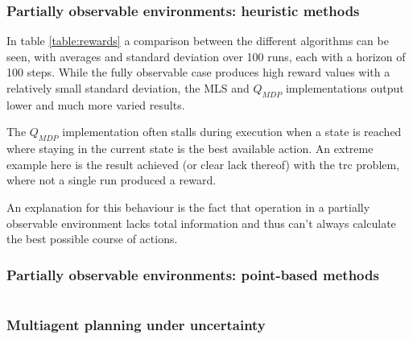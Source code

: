 \documentclass[10pt,a4paper]{article}
\begin{document}
\restoregeometry


\section{Partially observable environments: heuristic methods}

In table \ref{table:rewards} a comparison between the different algorithms can be seen, with averages and standard deviation over 100 runs, each with a horizon of 100 steps.
While the fully observable case produces high reward values with a relatively small standard deviation, the MLS and $Q_{MDP}$ implementations output lower and much more varied results.

The $Q_{MDP}$ implementation often stalls during execution when a state is reached where staying in the current state is the best available action.
An extreme example here is the result achieved (or clear lack thereof) with the trc problem, where not a single run produced a reward. 

An explanation for this behaviour is the fact that operation in a partially observable environment lacks total information and thus can't always calculate the best possible course of actions.


\section{Partially observable environments: point-based methods}


\part{}


\section{Multiagent planning under uncertainty}
\end{document}
